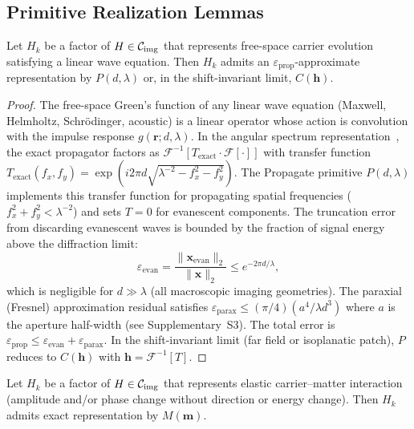 \documentclass[11pt]{article}
\begin{document}
\subsection{Primitive Realization Lemmas}

\begin{lemma}
\label{lem:prop}
Let $H_k$ be a factor of $H \in \mathcal{C}_{\mathrm{img}}$ that represents free-space carrier evolution satisfying a linear wave equation. Then $H_k$ admits an $\varepsilon_{\mathrm{prop}}$-approximate representation by $P(d, \lambda)$ or, in the shift-invariant limit, $C(\mathbf{h})$.
\end{lemma}

\begin{proof}
The free-space Green's function of any linear wave equation (Maxwell, Helmholtz, Schr\"{o}dinger, acoustic) is a linear operator whose action is convolution with the impulse response $g(\mathbf{r}; d, \lambda)$. In the angular spectrum representation~\cite{goodman2005fourier}, the exact propagator factors as $\mathcal{F}^{-1}[T_{\mathrm{exact}} \cdot \mathcal{F}[\cdot]]$ with transfer function $T_{\mathrm{exact}}(f_x, f_y) = \exp(i 2\pi d \sqrt{\lambda^{-2} - f_x^2 - f_y^2})$. The Propagate primitive $P(d, \lambda)$ implements this transfer function for propagating spatial frequencies ($f_x^2 + f_y^2 < \lambda^{-2}$) and sets $T = 0$ for evanescent components. The truncation error from discarding evanescent waves is bounded by the fraction of signal energy above the diffraction limit:
\[
\varepsilon_{\mathrm{evan}} = \frac{\|\mathbf{x}_{\mathrm{evan}}\|_2}{\|\mathbf{x}\|_2} \leq e^{-2\pi d/\lambda},
\]
which is negligible for $d \gg \lambda$ (all macroscopic imaging geometries). The paraxial (Fresnel) approximation residual satisfies $\varepsilon_{\mathrm{parax}} \leq (\pi/4)(a^4/\lambda d^3)$ where $a$ is the aperture half-width (see Supplementary~S3). The total error is $\varepsilon_{\mathrm{prop}} \leq \varepsilon_{\mathrm{evan}} + \varepsilon_{\mathrm{parax}}$. In the shift-invariant limit (far field or isoplanatic patch), $P$ reduces to $C(\mathbf{h})$ with $\mathbf{h} = \mathcal{F}^{-1}[T]$.
\end{proof}

\begin{lemma}
\label{lem:elastic}
Let $H_k$ be a factor of $H \in \mathcal{C}_{\mathrm{img}}$ that represents elastic carrier--matter interaction (amplitude and/or phase change without direction or energy change). Then $H_k$ admits exact representation by $M(\mathbf{m})$.
\end{lemma}
\end{document}

